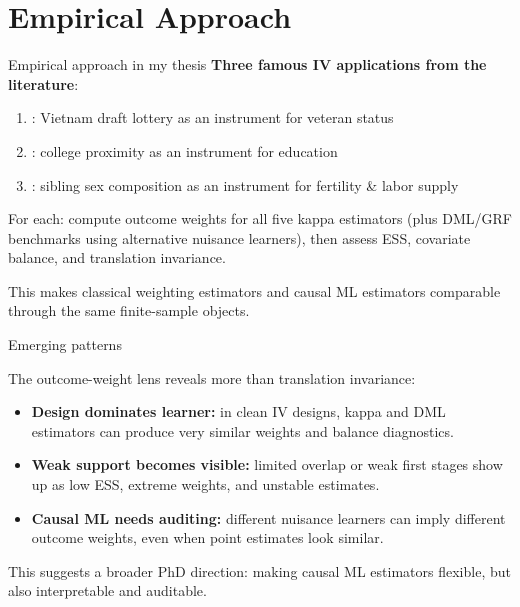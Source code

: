 \documentclass[11pt]{beamer}
\begin{document}
\section{Empirical Approach}

\begin{frame}{Empirical approach in my thesis}
\textbf{Three famous IV applications from the literature}:
\begin{enumerate}
\item \citet{angrist1990lifetime}: Vietnam draft lottery as an instrument for veteran status
\item \citet{card1993using}: college proximity as an instrument for education
\item \citet{angrist1996children}: sibling sex composition as an instrument for fertility & labor supply
\end{enumerate}

\vspace{0.3cm}
For each: compute outcome weights for all five kappa estimators (plus DML/GRF benchmarks using alternative nuisance learners), then assess ESS, covariate balance, and translation invariance.
\vspace{0.2cm}

\alert{This makes classical weighting estimators and causal ML estimators comparable through the same finite-sample objects.}
\end{frame}



\begin{frame}{Emerging patterns}

The outcome-weight lens reveals more than translation invariance:

\vspace{0.2cm}

\begin{itemize}
\item \textbf{Design dominates learner:} in clean IV designs, kappa and DML estimators can produce very similar weights and balance diagnostics.

\vspace{0.1cm}

\item \textbf{Weak support becomes visible:} limited overlap or weak first stages show up as low ESS, extreme weights, and unstable estimates.

\vspace{0.1cm}

\item \textbf{Causal ML needs auditing:} different nuisance learners can imply different outcome weights, even when point estimates look similar.
\end{itemize}

\vspace{0.3cm}
\centering
\alert{This suggests a broader PhD direction: making causal ML estimators flexible, but also interpretable and auditable.}

\end{frame}
\end{document}
